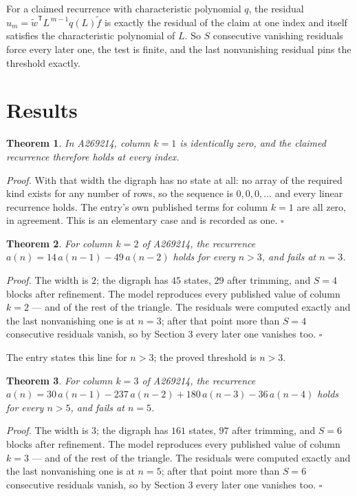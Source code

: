 \documentclass[11pt]{article}
\newtheorem{theorem}{Theorem}
\theoremstyle{definition}
\begin{document}
For a claimed recurrence with characteristic polynomial $q$, the residual $u_m = \tilde w^{\mathsf T}L^{\,m-1}q(L)\tilde f$ is exactly the residual of the claim at one index and itself satisfies the characteristic polynomial of $L$. So $S$ consecutive vanishing residuals force every later one, the test is finite, and the last nonvanishing residual pins the threshold exactly.

\section{Results}

\begin{theorem} In A269214, column $k = 1$ is identically zero, and the claimed recurrence therefore holds at every index.\end{theorem}

{\itshape Proof.} With that width the digraph has no state at all: no array of the required kind exists for any number of rows, so the sequence is $0,0,0,\dots$ and every linear recurrence holds. The entry's own published terms for column $k = 1$ are all zero, in agreement. This is an elementary case and is recorded as one. $\square$

\begin{theorem} For column $k = 2$ of A269214, the recurrence $a(n) = 14\,a(n-1) - 49\,a(n-2)$ holds for every $n > 3$, and fails at $n = 3$.\end{theorem}

{\itshape Proof.} The width is $2$; the digraph has $45$ states, $29$ after trimming, and $S = 4$ blocks after refinement. The model reproduces every published value of column $k = 2$ --- and of the rest of the triangle. The residuals were computed exactly and the last nonvanishing one is at $n = 3$; after that point more than $S = 4$ consecutive residuals vanish, so by Section 3 every later one vanishes too. $\square$

The entry states this line for $n > 3$; the proved threshold is $n > 3$.

\begin{theorem} For column $k = 3$ of A269214, the recurrence $a(n) = 30\,a(n-1) - 237\,a(n-2) + 180\,a(n-3) - 36\,a(n-4)$ holds for every $n > 5$, and fails at $n = 5$.\end{theorem}

{\itshape Proof.} The width is $3$; the digraph has $161$ states, $97$ after trimming, and $S = 6$ blocks after refinement. The model reproduces every published value of column $k = 3$ --- and of the rest of the triangle. The residuals were computed exactly and the last nonvanishing one is at $n = 5$; after that point more than $S = 6$ consecutive residuals vanish, so by Section 3 every later one vanishes too. $\square$
\end{document}
